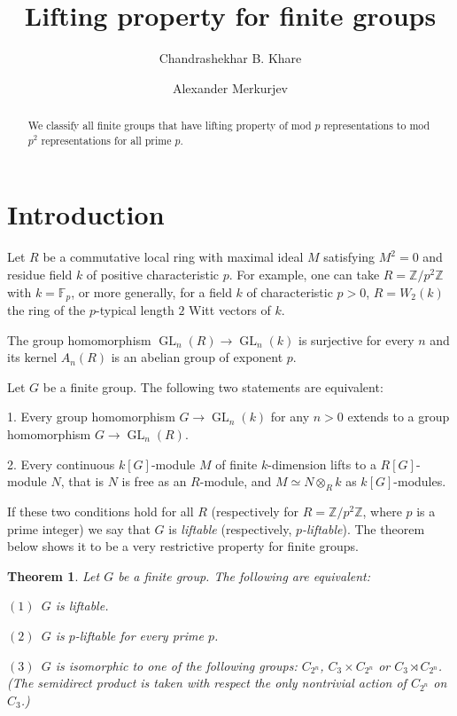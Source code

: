 \documentclass[12pt]{amsart}
\title
[Lifting property for finite groups] %
{Lifting property for finite groups}
\author{Chandrashekhar B. Khare}
\author{Alexander Merkurjev}
\numberwithin{equation}{section}
\newtheorem{theorem}[equation]{Theorem}
\theoremstyle{definition}
\renewcommand{\(}{\bigl(}
\renewcommand{\)}{\bigr)}
\newcommand{\tens}{\otimes}
\newcommand{\GL}{\operatorname{GL}}
\newcommand{\F}{\mathbb{F}}
\newcommand{\Z}{\mathbb{Z}}
\begin{document}
\begin{abstract}
We classify all finite groups that have lifting property of mod $p$ representations to mod $p^2$ representations
for all prime $p$.
\end{abstract}

\maketitle

\section{Introduction}


Let $R$ be a commutative local ring with maximal ideal $M$ satisfying $M^2=0$ and residue field $k$ of positive characteristic $p$.
For example, one can take $R=\Z/p^2\Z$ with $k=\F_p$, or more generally, for a field $k$ of characteristic $p>0$,
$R=W_2(k)$ the ring of the $p$-typical length $2$ Witt vectors of $k$.

The group
homomorphism $\GL_n(R)\to \GL_n(k)$ is surjective for every $n$ and its kernel $A_n(R)$ is an abelian group of exponent $p$.

Let $G$ be a   finite  group.
The following two statements are equivalent:

\medskip

1. Every    group homomorphism $G\to\GL_n(k)$  for any $n>0$ extends to a  group homomorphism $G\to\GL_n(R)$. 

\smallskip

2. Every continuous   $k[G]$-module $M$ of finite $k$-dimension  lifts to a  $R[G]$-module $N$, that is $N$ is free as
an $R$-module,  and $M\simeq N\tens_R k$ as $k[G]$-modules.

\medskip

If these two conditions hold for all $R$ (respectively for $R=\Z/p^2\Z$, where  $p$ is a prime integer) we say that $G$ is \emph{liftable}
(respectively, \emph{$p$-liftable}). The theorem below    shows it  to be a very restrictive property for finite groups.

\begin{theorem}\label{main}
Let $G$ be a finite group. The following are equivalent:

\noindent $(1)$\ $G$ is liftable.

\noindent $(2)$\  $G$ is $p$-liftable for every prime $p$.

\noindent $(3)$\  $G$ is isomorphic to one of the following groups: $C_{2^n}$, $C_3 \times C_{2^n}$ or $C_3 \rtimes  C_{2^n}$.
(The semidirect product is taken with respect the only nontrivial action of $ C_{2^n}$ on $C_3$.)
\end{theorem}
\end{document}
